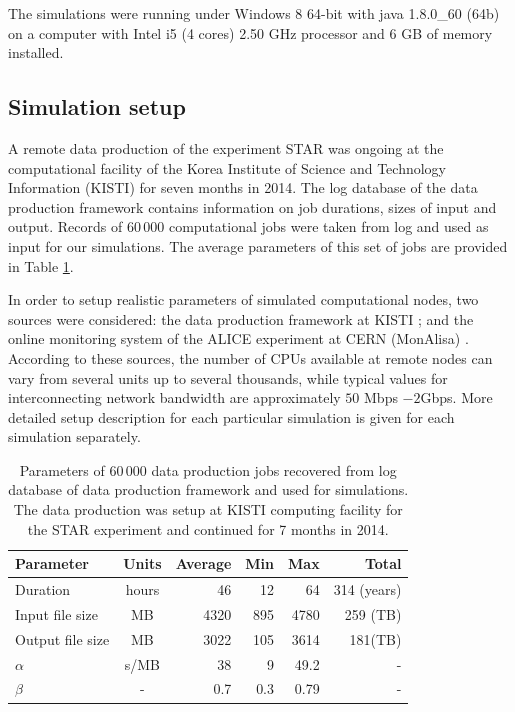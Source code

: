 \documentclass{svjour3}                     %
\begin{document}
The simulations were running under Windows 8 64-bit with java 1.8.0\_60 (64b) on a computer with Intel i5 (4 cores) 2.50 GHz processor and 6 GB of memory installed. 

\subsection{Simulation setup}
A remote data production of the experiment STAR was ongoing at the computational facility of the Korea Institute of Science and Technology Information (KISTI)\cite{KISTI} for seven months in 2014. The log database of the data production framework contains information on job durations, sizes of input and output. Records of 60\,000 computational jobs were taken from log and used as input for our simulations. The average parameters of this set of jobs are provided in Table \ref{tab:jobs}.

In order to setup realistic parameters of simulated computational nodes, two sources were considered: the data production framework at KISTI \cite{KISTI-production}; and the online monitoring system of the ALICE experiment at CERN (MonAlisa) \cite{MonAlisa}. According to these sources, the number of CPUs available at remote nodes can vary from several units up to several thousands, while typical values for interconnecting network bandwidth are approximately $50$ Mbps $- 2 $Gbps. More detailed setup description for each particular simulation is given for each simulation separately. 

\begin{table}
\caption{Parameters of 60\,000 data production jobs recovered from log database of data production framework and used for simulations. The data production was setup at KISTI computing facility for the STAR experiment and continued for 7 months in 2014.}
\label{tab:jobs}
\begin{center}
\begin{tabular}{ l  c  r  r  r	|r }
\hline %
  Parameter  & Units& Average & Min & Max & Total \\ \hline %
  Duration & hours & 46 & 12&64&314 (years) \\ 
  Input file size & MB & 4320& 895&4780&259 (TB) \\	
  Output file size & MB & 3022& 105&3614&181(TB) \\
  $\alpha$ & s/MB & 38& 9&49.2&- \\
  $\beta$ & - & 0.7& 0.3& 0.79&-\\	
  \hline %
\end{tabular}
    \end{center}
\end{table}
\end{document}
